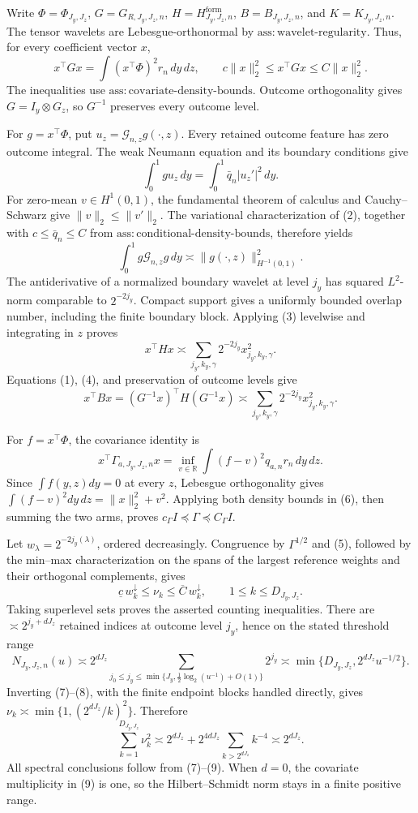 Write \(\Phi=\Phi_{J_y,J_z}\), \(G=G_{R,J_y,J_z,n}\), \(H=H^{\mathrm{form}}_{J_y,J_z,n}\), \(B=B_{J_y,J_z,n}\), and \(K=K_{J_y,J_z,n}\). The tensor wavelets are Lebesgue-orthonormal by \(\mathrm{ass{:}wavelet\text{-}regularity}\). Thus, for every coefficient vector \(x\),
\[
x^\top Gx=\int(x^\top\Phi)^2r_n\,dy\,dz,
\qquad c\|x\|_2^2\le x^\top Gx\le C\|x\|_2^2.                 \tag{1}
\]
The inequalities use \(\mathrm{ass{:}covariate\text{-}density\text{-}bounds}\). Outcome orthogonality gives \(G=I_y\otimes G_z\), so \(G^{-1}\) preserves every outcome level.

For \(g=x^\top\Phi\), put \(u_z=\mathcal G_{n,z}g(\cdot,z)\). Every retained outcome feature has zero outcome integral. The weak Neumann equation and its boundary conditions give
\[
\int_0^1g u_z\,dy=\int_0^1\bar q_n|u_z'|^2\,dy.                 \tag{2}
\]
For zero-mean \(v\in H^1(0,1)\), the fundamental theorem of calculus and Cauchy--Schwarz give \(\|v\|_2\le\|v'\|_2\). The variational characterization of (2), together with \(c\le\bar q_n\le C\) from \(\mathrm{ass{:}conditional\text{-}density\text{-}bounds}\), therefore yields
\[
\int_0^1g\mathcal G_{n,z}g\,dy\asymp\|g(\cdot,z)\|_{H^{-1}(0,1)}^2. \tag{3}
\]
The antiderivative of a normalized boundary wavelet at level \(j_y\) has squared \(L^2\)-norm comparable to \(2^{-2j_y}\). Compact support gives a uniformly bounded overlap number, including the finite boundary block. Applying (3) levelwise and integrating in \(z\) proves
\[
x^\top Hx\asymp\sum_{j_y,k_y,\gamma}2^{-2j_y}x_{j_y,k_y,\gamma}^2. \tag{4}
\]
Equations (1), (4), and preservation of outcome levels give
\[
x^\top Bx=(G^{-1}x)^\top H(G^{-1}x)
\asymp\sum_{j_y,k_y,\gamma}2^{-2j_y}x_{j_y,k_y,\gamma}^2.       \tag{5}
\]

For \(f=x^\top\Phi\), the covariance identity is
\[
x^\top\Gamma_{a,J_y,J_z,n}x
=\inf_{v\in\mathbb R}\int(f-v)^2q_{a,n}r_n\,dy\,dz.             \tag{6}
\]
Since \(\int f(y,z)dy=0\) at every \(z\), Lebesgue orthogonality gives \(\int(f-v)^2dy\,dz=\|x\|_2^2+v^2\). Applying both density bounds in (6), then summing the two arms, proves \(c_\Gamma I\preceq\Gamma\preceq C_\Gamma I\).

Let \(w_\lambda=2^{-2j_y(\lambda)}\), ordered decreasingly. Congruence by \(\Gamma^{1/2}\) and (5), followed by the min--max characterization on the spans of the largest reference weights and their orthogonal complements, gives
\[
\underline c\,w_k^\downarrow\le\nu_k\le\overline C\,w_k^\downarrow,
\qquad 1\le k\le D_{J_y,J_z}.                                   \tag{7}
\]
Taking superlevel sets proves the asserted counting inequalities. There are \(\asymp2^{j_y+dJ_z}\) retained indices at outcome level \(j_y\), hence on the stated threshold range
\[
N_{J_y,J_z,n}(u)
\asymp2^{dJ_z}\sum_{j_0\le j_y\le\min\{J_y,\frac12\log_2(u^{-1})+O(1)\}}2^{j_y}
\asymp\min\{D_{J_y,J_z},2^{dJ_z}u^{-1/2}\}.                    \tag{8}
\]
Inverting (7)--(8), with the finite endpoint blocks handled directly, gives \(\nu_k\asymp\min\{1,(2^{dJ_z}/k)^2\}\). Therefore
\[
\sum_{k=1}^{D_{J_y,J_z}}\nu_k^2
\asymp2^{dJ_z}+2^{4dJ_z}\sum_{k>2^{dJ_z}}k^{-4}\asymp2^{dJ_z}. \tag{9}
\]
All spectral conclusions follow from (7)--(9). When \(d=0\), the covariate multiplicity in (9) is one, so the Hilbert--Schmidt norm stays in a finite positive range.

